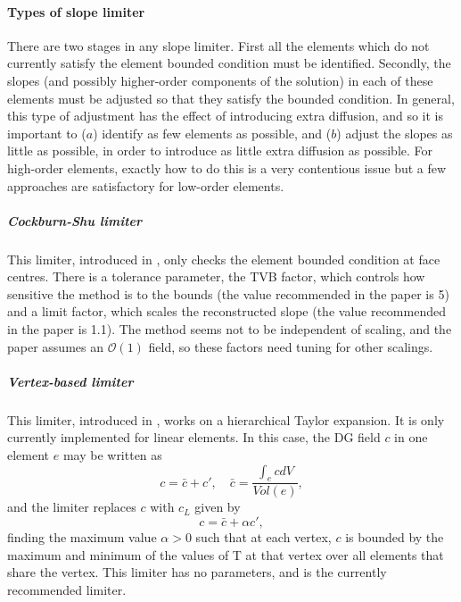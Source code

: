 \paragraph{Types of slope limiter}
\label{Sect:ND_DG_slope_limiters}
There are two stages in any slope limiter. First all the elements
which do not currently satisfy the element bounded condition must be
identified. Secondly, the slopes (and possibly higher-order components
of the solution) in each of these elements must be adjusted so that
they satisfy the bounded condition. In general, this type of
adjustment has the effect of introducing extra diffusion, and so it is important to ($a$)
identify as few elements as possible, and ($b$) adjust the slopes as
little as possible, in order to introduce as little extra diffusion as
possible. For high-order elements, exactly how to do this is a very
contentious issue but a few approaches are satisfactory for low-order
elements.
\subparagraph{Cockburn-Shu limiter}
This limiter, introduced in \cite{cockburn2001}, only checks the element
bounded condition at face centres. There is a tolerance parameter, the
TVB factor, which controls how sensitive the method is to the bounds
(the value recommended in the paper is 5) and a limit factor, which
scales the reconstructed slope (the value recommended in the paper is
1.1). The method seems not to be independent of scaling, and the paper
assumes an $\mathcal{O}(1)$ field, so these factors need tuning for
other scalings.

\subparagraph{Vertex-based limiter}
This limiter, introduced in \cite{Ku2010}, works on a hierarchical
Taylor expansion. It is only currently implemented for linear elements.
In this case, the DG field $c$ in one element $e$ may be written as
\[
c = \bar{c} + c', \quad \bar{c} = \frac{\int_e c dV}{Vol(e)},
\]
and the limiter replaces $c$ with $c_L$ given by
\[
c = \bar{c} + \alpha c',
\]
finding the maximum value $\alpha>0$ such that at each vertex, $c$ is
bounded by the maximum and minimum of the values of T at that vertex
over all elements that share the vertex.  This limiter has no
parameters, and is the currently recommended limiter.

